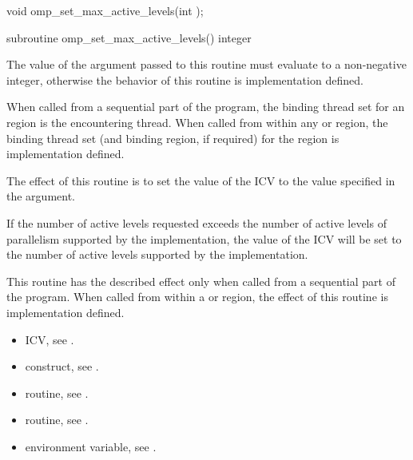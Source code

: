 \format
\begin{ccppspecific}
\begin{ompcFunction}
void omp_set_max_active_levels(int );
\end{ompcFunction}
\end{ccppspecific}

\begin{fortranspecific}
\begin{ompfSubroutine}
subroutine omp_set_max_active_levels()
integer 
\end{ompfSubroutine}
\end{fortranspecific}

\constraints
The value of the argument passed to this routine must evaluate to a 
non-negative integer, otherwise the behavior of this routine is 
implementation defined.

\binding
When called from a sequential part of the program, the binding thread 
set for an  region is the encountering 
thread. When called from within any  or  
region, the binding thread set (and binding region, if required) for 
the  region is implementation defined.

\effect
The effect of this routine is to set the value of the 
 ICV to the value specified in the argument.

If the number of active levels requested exceeds the number of active 
levels of parallelism supported by the implementation, the value of the 
 ICV will be set to the number of active 
levels supported by the implementation.

This routine has the described effect only when called from a sequential 
part of the program. When called from within a  or  
region, the effect of this routine is implementation defined.

\crossreferences
\begin{itemize}
\item {} ICV, see
.

\item {} construct, see
.

\item {} routine, see
.

\item {} routine, see
.

\item {} environment variable, see
.
\end{itemize}



